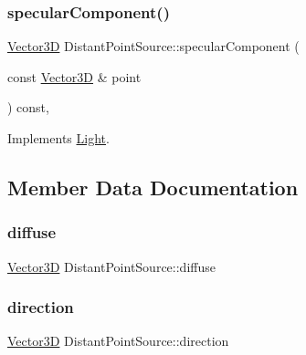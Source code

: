 \subsubsection{\texorpdfstring{specularComponent()}{specularComponent()}}
{\footnotesize\ttfamily \mbox{\hyperlink{classVector3D}{Vector3D}} Distant\+Point\+Source\+::specular\+Component (\begin{DoxyParamCaption}\item[{const \mbox{\hyperlink{classVector3D}{Vector3D}} \&}]{point }\end{DoxyParamCaption}) const\hspace{0.3cm}{\ttfamily [override]}, {\ttfamily [virtual]}}



Implements \mbox{\hyperlink{classLight_a2a4cdf8081c2cab02757c2464610a32f}{Light}}.



\subsection{Member Data Documentation}
\mbox{\label{classDistantPointSource_ab9a77355eb9d8fc8596d75c57de4fb5e}} 
\subsubsection{\texorpdfstring{diffuse}{diffuse}}
{\footnotesize\ttfamily \mbox{\hyperlink{classVector3D}{Vector3D}} Distant\+Point\+Source\+::diffuse\hspace{0.3cm}{\ttfamily [private]}}

\mbox{\label{classDistantPointSource_a8ed31d9e26d44381c1bd22b5f1b15c6c}} 
\subsubsection{\texorpdfstring{direction}{direction}}
{\footnotesize\ttfamily \mbox{\hyperlink{classVector3D}{Vector3D}} Distant\+Point\+Source\+::direction\hspace{0.3cm}{\ttfamily [private]}}

\mbox{\label{classDistantPointSource_af6bebc971d66f68f97045712db771411}} 
